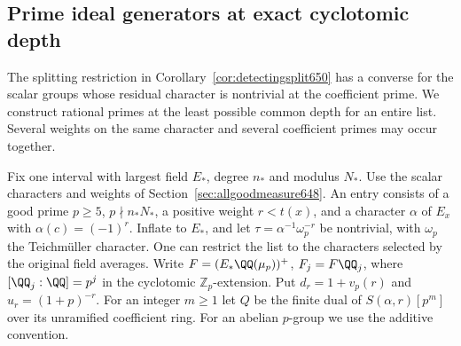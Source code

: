 \documentclass[a4paper,11pt]{article}
\theoremstyle{definition}
\theoremstyle{remark}
\newcommand{\ZZ}{\mathbb Z}\newcommand{\ord}{\operatorname{ord}}
\numberwithin{equation}{section}
\begin{document}
\subsection{Prime ideal generators at exact cyclotomic depth}
\label{sec:simultaneousdepth652}

The splitting restriction in Corollary~\ref{cor:detectingsplit650}
has a converse for the scalar groups whose residual character
is nontrivial at the coefficient prime. We construct rational
primes at the least possible common depth for an entire list.
Several weights on the same character and several coefficient
primes may occur together.

Fix one interval with largest field \(E_*\), degree \(n_*\)
and modulus \(N_*\). Use the scalar characters and weights
of Section~\ref{sec:allgoodmeasure648}. An entry consists of
a good prime \(p\ge5\), \(p\nmid n_*N_*\), a positive weight
\(r<t(x)\), and a character \(\alpha\) of \(E_x\) with
\(\alpha(c)=(-1)^r\). Inflate to \(E_*\), and let
\(\tau=\alpha^{-1}\omega_p^{-r}\) be nontrivial, with
\(\omega_p\) the Teichm\"uller character. One can restrict
the list to the characters selected by the original field
averages. Write \(F=(E_*\QQ(\mu_p))^+\),
\(F_j=F\QQ_j\), where \([\QQ_j:\QQ]=p^j\) in the cyclotomic
\(\ZZ_p\)-extension. Put \(d_r=1+v_p(r)\) and \(u_r=(1+p)^{-r}\).
For an integer \(m\ge1\) let \(Q\) be the finite dual of
\(S(\alpha,r)[p^m]\) over its unramified coefficient ring.
For an abelian \(p\)-group we use the additive convention.
\end{document}
